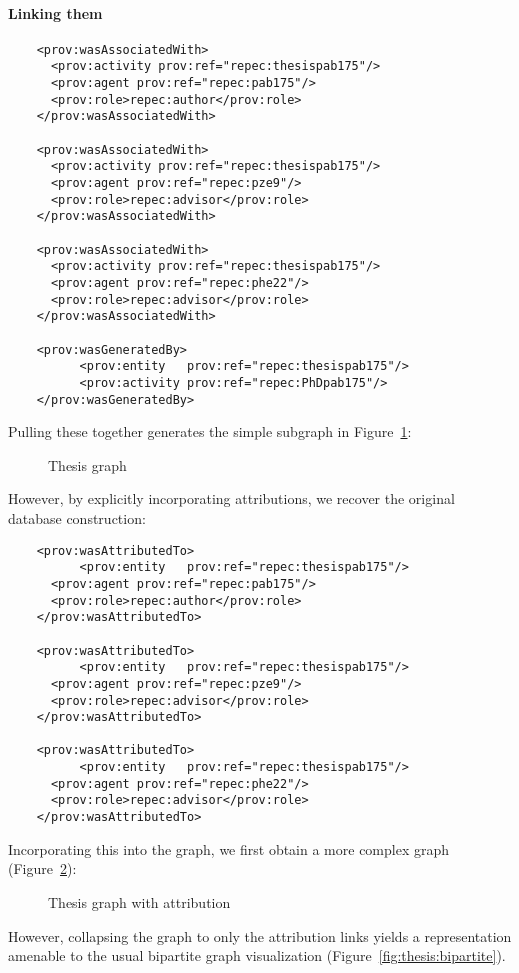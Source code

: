 \documentclass[x11names]{article}
\begin{document}
\paragraph{Linking them}
\begin{lstlisting}
    <prov:wasAssociatedWith>
      <prov:activity prov:ref="repec:thesispab175"/>
      <prov:agent prov:ref="repec:pab175"/>
      <prov:role>repec:author</prov:role>
    </prov:wasAssociatedWith>
    
    <prov:wasAssociatedWith>
      <prov:activity prov:ref="repec:thesispab175"/>
      <prov:agent prov:ref="repec:pze9"/>
      <prov:role>repec:advisor</prov:role>
    </prov:wasAssociatedWith>

    <prov:wasAssociatedWith>
      <prov:activity prov:ref="repec:thesispab175"/>
      <prov:agent prov:ref="repec:phe22"/>
      <prov:role>repec:advisor</prov:role>
    </prov:wasAssociatedWith>

    <prov:wasGeneratedBy>
          <prov:entity   prov:ref="repec:thesispab175"/>
          <prov:activity prov:ref="repec:PhDpab175"/>
    </prov:wasGeneratedBy>
\end{lstlisting}
Pulling these together generates the simple subgraph in Figure~\ref{fig:thesis:basic}:
\begin{figure}
\caption{Thesis graph}\label{fig:thesis:basic}

\end{figure}
However, by explicitly incorporating attributions, we recover the original database construction:
\begin{lstlisting}
    <prov:wasAttributedTo>
          <prov:entity   prov:ref="repec:thesispab175"/>
      <prov:agent prov:ref="repec:pab175"/>
      <prov:role>repec:author</prov:role>
    </prov:wasAttributedTo>
    
    <prov:wasAttributedTo>
          <prov:entity   prov:ref="repec:thesispab175"/>
      <prov:agent prov:ref="repec:pze9"/>
      <prov:role>repec:advisor</prov:role>
    </prov:wasAttributedTo>

    <prov:wasAttributedTo>
          <prov:entity   prov:ref="repec:thesispab175"/>
      <prov:agent prov:ref="repec:phe22"/>
      <prov:role>repec:advisor</prov:role>
    </prov:wasAttributedTo>

\end{lstlisting}
Incorporating this into the graph, we first obtain a more complex graph (Figure~\ref{fig:thesis:complex}):
\begin{figure}
\caption{Thesis graph with attribution}\label{fig:thesis:complex}

\end{figure}
However, collapsing the graph to only the attribution links yields a representation amenable to the usual bipartite graph visualization (Figure~\ref{fig:thesis:bipartite}).
\end{document}
